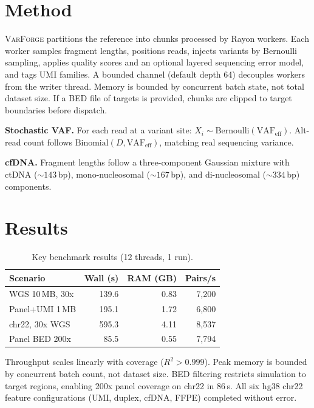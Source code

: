 \documentclass[10pt, twocolumn]{article}
\newcommand{\varforge}{\textsc{VarForge}\xspace}
\begin{document}
\section{Method}

\varforge{} partitions the reference into chunks processed by Rayon workers.
Each worker samples fragment lengths, positions reads, injects variants by Bernoulli sampling, applies quality scores and an optional layered sequencing error model, and tags UMI families.
A bounded channel (default depth 64) decouples workers from the writer thread.
Memory is bounded by concurrent batch state, not total dataset size.
If a BED file of targets is provided, chunks are clipped to target boundaries before dispatch.

\textbf{Stochastic VAF.}
For each read at a variant site: $X_i \sim \text{Bernoulli}(\text{VAF}_\text{eff})$.
Alt-read count follows $\text{Binomial}(D, \text{VAF}_\text{eff})$, matching real sequencing variance.

\textbf{cfDNA.}
Fragment lengths follow a three-component Gaussian mixture with ctDNA (${\sim}143$\,bp), mono-nucleosomal (${\sim}167$\,bp), and di-nucleosomal (${\sim}334$\,bp) components.

\section{Results}

\begin{table}[H]
\centering
\caption{Key benchmark results (12 threads, 1 run).}
\small
\setlength{\tabcolsep}{3pt}
\begin{tabular}{@{}lrrr@{}}
\toprule
Scenario & Wall (s) & RAM (GB) & Pairs/s \\
\midrule
WGS 10\,MB, 30x  & 139.6 & 0.83 &  7,200 \\
Panel+UMI 1\,MB  & 195.1 & 1.72 &  6,800 \\
chr22, 30x WGS   & 595.3 & 4.11 &  8,537 \\
Panel BED 200x   &  85.5 & 0.55 &  7,794 \\
\bottomrule
\end{tabular}
\end{table}

Throughput scales linearly with coverage ($R^2 > 0.999$).
Peak memory is bounded by concurrent batch count, not dataset size.
BED filtering restricts simulation to target regions, enabling 200x panel coverage on chr22 in 86\,s.
All six hg38 chr22 feature configurations (UMI, duplex, cfDNA, FFPE) completed without error.
\end{document}
